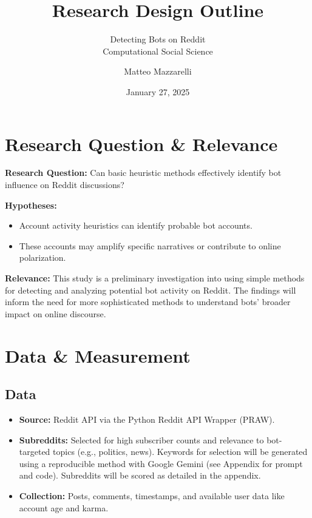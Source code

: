 \documentclass[
  letterpaper,
  DIV=11,
  numbers=noendperiod]{scrartcl}
\title{Research Design Outline}
\subtitle{Detecting Bots on Reddit\\
Computational Social Science}
\author{Matteo Mazzarelli}
\date{January 27, 2025}
\providecommand{\tightlist}{%
  \setlength{\itemsep}{0pt}\setlength{\parskip}{0pt}}\usepackage{longtable,booktabs,array}
\begin{document}
\maketitle


\section{Research Question \&
Relevance}\label{research-question-relevance}

\textbf{Research Question:} Can basic heuristic methods effectively
identify bot influence on Reddit discussions?

\textbf{Hypotheses:}

\begin{itemize}
\tightlist
\item
  Account activity heuristics can identify probable bot accounts.
\item
  These accounts may amplify specific narratives or contribute to online
  polarization.
\end{itemize}

\textbf{Relevance:} This study is a preliminary investigation into using
simple methods for detecting and analyzing potential bot activity on
Reddit. The findings will inform the need for more sophisticated methods
to understand bots' broader impact on online discourse.

\section{Data \& Measurement}\label{data-measurement}

\subsection{Data}\label{data}

\begin{itemize}
\tightlist
\item
  \textbf{Source:} Reddit API via the Python Reddit API Wrapper (PRAW).
\item
  \textbf{Subreddits:} Selected for high subscriber counts and relevance
  to bot-targeted topics (e.g., politics, news). Keywords for selection
  will be generated using a reproducible method with Google Gemini (see
  Appendix for prompt and code). Subreddits will be scored as detailed
  in the appendix.
\item
  \textbf{Collection:} Posts, comments, timestamps, and available user
  data like account age and karma.
\end{itemize}
\end{document}
